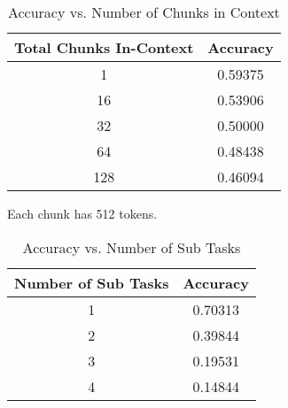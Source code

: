 \begin{table}[h]
    \centering
    \begin{tabular}{cc}
        \toprule
        \textbf{Total Chunks In-Context} & \textbf{Accuracy} \\
        \midrule
        1   & 0.59375 \\
        16  & 0.53906 \\
        32  & 0.50000 \\
        64  & 0.48438 \\
        128 & 0.46094 \\
        \bottomrule
    \end{tabular}
    \caption{Accuracy vs. Number of Chunks in Context} Each chunk has 512 tokens.
    \label{tab:chunks_vs_accuracy}
\end{table}

\begin{table}[h]
    \centering
    \begin{tabular}{cc}
        \toprule
        \textbf{Number of Sub Tasks} & \textbf{Accuracy} \\
        \midrule
        1 & 0.70313 \\
        2 & 0.39844 \\
        3 & 0.19531 \\
        4 & 0.14844 \\
        \bottomrule
    \end{tabular}
    \caption{Accuracy vs. Number of Sub Tasks}
    \label{tab:subtasks_vs_accuracy}
\end{table}

